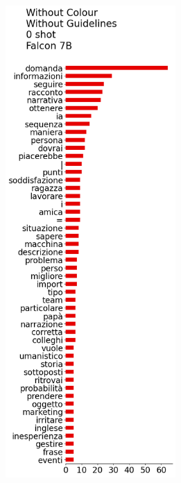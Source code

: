 \begin{figure}[!htbp]
\begin{subfigure}[t]{0.45\textwidth}
        \includegraphics[height=18cm]{assets/imgs/tokens-vertical/token_distribution_no_color_no_guidelines_0_shot_falcon-7b.png}
        \label{sub:persona-narrative-elicitation-comparison-distribution-falcon}
    \end{subfigure}
    \hspace{-1cm}
    \begin{subfigure}[t]{0.2\textwidth}
        \centering
        \captionsetup{width=.8\linewidth}%

\end{subfigure}
\end{figure}
